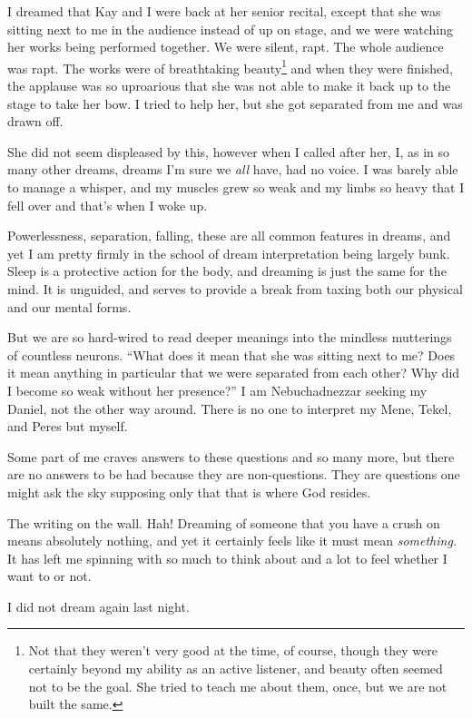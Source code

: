 I dreamed that Kay and I were back at her senior recital, except that she was sitting next to me in the audience instead of up on stage, and we were watching her works being performed together. We were silent, rapt. The whole audience was rapt. The works were of breathtaking beauty\footnote{Not that they weren't very good at the time, of course, though they were certainly beyond my ability as an active listener, and beauty often seemed not to be the goal. She tried to teach me about them, once, but we are not built the same.} and when they were finished, the applause was so uproarious that she was not able to make it back up to the stage to take her bow. I tried to help her, but she got separated from me and was drawn off.

She did not seem displeased by this, however when I called after her, I, as in so many other dreams, dreams I'm sure we \emph{all} have, had no voice. I was barely able to manage a whisper, and my muscles grew so weak and my limbs so heavy that I fell over and that's when I woke up.

Powerlessness, separation, falling, these are all common features in dreams, and yet I am pretty firmly in the school of dream interpretation being largely bunk. Sleep is a protective action for the body, and dreaming is just the same for the mind. It is unguided, and serves to provide a break from taxing both our physical and our mental forms.

But we are so hard-wired to read deeper meanings into the mindless mutterings of countless neurons. ``What does it mean that she was sitting next to me? Does it mean anything in particular that we were separated from each other? Why did I become so weak without her presence?'' I am Nebuchadnezzar seeking my Daniel, not the other way around. There is no one to interpret my Mene, Tekel, and Peres but myself.

Some part of me craves answers to these questions and so many more, but there are no answers to be had because they are non-questions. They are questions one might ask the sky supposing only that that is where God resides.

The writing on the wall. Hah! Dreaming of someone that you have a crush on means absolutely nothing, and yet it certainly feels like it must mean \emph{something.} It has left me spinning with so much to think about and a lot to feel whether I want to or not.

I did not dream again last night.

